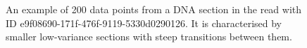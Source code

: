 \begin{figure}
\centering

	\caption[An example of 200 data points from a DNA section in the read with ID e9f08690-171f-476f-9119-5330d0290126.]{\label{fig:dna-section}An example of 200 data points from a DNA section in the read with ID e9f08690-171f-476f-9119-5330d0290126. It is characterised by smaller low-variance sections with steep transitions between them.}
\end{figure}
